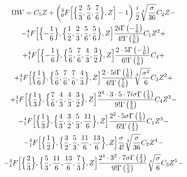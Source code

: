 \begin{multline}

\label{eq:Aristov_Prosviryakov:solvelo}

\Omega W=C_5 Z+ \left({^{3}_{0}F} \Bigl[\Bigl\{\frac{2}{3}, \frac{5}{6}, \frac{7}{6} \Bigr\},Z\Bigr]-1\right) \frac{i}{2} \sqrt[3]{\frac{\sigma}{36}} C_2 Z-

\\

-{^{4}_{1}F} \Bigl[\Bigl\{-\frac{1}{6} \Bigr\}, \Bigl\{\frac{1}{2},\frac{2}{3}, \frac{5}{6}, \frac{5}{6} \Bigr\},Z\Bigr]\frac{2i \Gamma\left(-\frac{1}{6}\right)}{4!\Gamma\left(\frac{5}{6}\right)} C_1 Z^2+

\\

+{^{4}_{1}F} \Bigl[\Bigl\{-\frac{1}{6} \Bigr\},\Bigl\{\frac{5}{6},\frac{7}{6}, \frac{4}{3}, \frac{3}{2} \Bigr\},Z\Bigr]\frac{2\cdot 5\Gamma\left(-\frac{1}{6}\right)}{6!\Gamma\left(\frac{5}{6}\right)} C_4+

\\

+{^{4}_{1}F} \Bigl[\Bigl\{\frac{1}{6} \Bigr\},\Bigl\{\frac{5}{6},\frac{7}{6}, \frac{7}{6}, \frac{4}{3} \Bigr\},Z\Bigr]\frac{2\cdot 5i \Gamma\left(\frac{1}{6}\right)}{6!\Gamma\left(\frac{7}{6}\right)} \sqrt[3]{\frac{\sigma^2}{6}} C_3 Z^2+

\\

+{^{4}_{1}F} \Bigl[\Bigl\{\frac{1}{3} \Bigr\},\Bigl\{\frac{7}{6},\frac{4}{3}, \frac{4}{3}, \frac{3}{2} \Bigr\},Z\Bigr]\frac{2^4\cdot 3\cdot 5\cdot 7i \sigma \Gamma\left(\frac{1}{3}\right)}{9!\Gamma\left(\frac{4}{3}\right)} C_4 Z^3-

\\

-{^{4}_{1}F} \Bigl[\Bigl\{\frac{1}{3} \Bigr\},\Bigl\{\frac{4}{3},\frac{3}{2}, \frac{5}{3}, \frac{11}{6} \Bigr\},Z\Bigr]\frac{2^2\cdot 5\sigma \Gamma\left(\frac{1}{3}\right)}{6!\Gamma\left(\frac{4}{3}\right)} C_1 Z^3-

\\

-{^{4}_{1}F} \Bigl[\Bigl\{\frac{1}{2} \Bigr\},\Bigl\{\frac{3}{2},\frac{5}{3}, \frac{11}{6}, \frac{13}{6} \Bigr\},Z\Bigr]\frac{\sigma }{4!}\sqrt[3]{\frac{\sigma}{36}} C_2 Z^4-

\\

-{^{4}_{1}F} \Bigl[\Bigl\{\frac{2}{3} \Bigr\},\Bigl\{\frac{5}{3},\frac{11}{6}, \frac{13}{6}, \frac{7}{3} \Bigr\},Z\Bigr] \frac{2^4\cdot 3^2\cdot 7\sigma \Gamma\left(\frac{2}{3}\right)}{9!\Gamma\left(\frac{5}{3}\right)}\sqrt[3]{\frac{\sigma}{6}} C_3 Z^5-


\end{multline}
